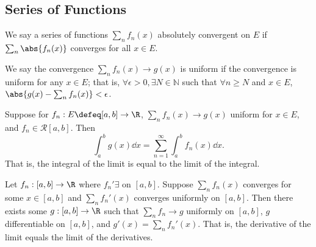 \subsection{Series of Functions}
\begin{definition}[Convergence]
    We say a series of functions $\sum_n f_n(x)$ absolutely convergent on $E$ if $\sum_n \abs{f_n(x)}$ converges for all $x \in E$.

    We say the convergence $\sum_n f_n(x) \to g(x)$ is uniform if the convergence is uniform for any $x \in E$; that is, $\forall \epsilon > 0, \exists N \in \mathbb{N}$ such that $\forall n \geq N$ and $x \in E$, $\abs{g(x) - \sum_n f_n(x)} < \epsilon$.
\end{definition}

\begin{proposition}
    Suppose for $f_n : E \defeq [a, b] \to \R$, $\sum_n f_n(x) \to g(x)$ uniform for $x \in E$, and $f_n \in \mathcal{R}[a, b]$. Then \[
    \int_a^b g(x) \dd{x} = \sum_{n=1}^\infty \int_a^b f_n(x) \dd{x}.    
    \]
    That is, the integral of the limit is equal to the limit of the integral.
\end{proposition}

\begin{proposition}
    Let $f_n :[ a, b] \to \R$ where $f_n' \exists$ on $[a, b]$. Suppose $\sum_n f_n(x)$ converges for some $x \in [a, b]$ and $\sum_n f_n'(x)$ converges uniformly on $[a, b]$. Then there exists some $g : [a, b] \to \R$ such that $\sum_n f_n \to g$ uniformly on $[a, b]$, $g$ differentiable on $[a, b]$, and $g'(x) = \sum_n f_n'(x)$. That is, the derivative of the limit equals the limit of the derivatives.
\end{proposition}